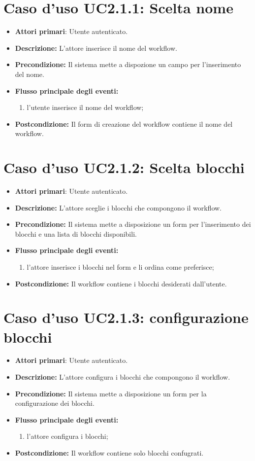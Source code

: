 {{{\section{Caso d'uso UC2.1.1: Scelta nome }
\begin{itemize}
	\item \textbf{Attori primari}: Utente autenticato.
	\item \textbf{Descrizione:} L'attore inserisce il nome del workflow.
	\item \textbf{Precondizione:} Il sistema mette a dispozione un campo per l'inserimento del nome.
	\item \textbf{Flusso principale degli eventi:}
	\begin{enumerate}
		\item l'utente inserisce il nome del workflow;
	\end{enumerate}
	\item \textbf{Postcondizione:} Il form di creazione del workflow contiene il nome del workflow.
\end{itemize}
\section{Caso d'uso UC2.1.2: Scelta blocchi }
\begin{itemize}
	\item \textbf{Attori primari}: Utente autenticato.
	\item \textbf{Descrizione:} L'attore sceglie i blocchi che compongono il workflow.
	\item \textbf{Precondizione:} Il sistema mette a disposizione un form per l'inserimento dei blocchi e una lista di blocchi disponibili.
	\item \textbf{Flusso principale degli eventi:}
	\begin{enumerate}
		\item l'attore inserisce i blocchi nel form e li ordina come preferisce;
	\end{enumerate}
	\item \textbf{Postcondizione:} Il workflow contiene i blocchi desiderati dall'utente.
\end{itemize}
\section{Caso d'uso UC2.1.3: configurazione blocchi }
\begin{itemize}
	\item \textbf{Attori primari}: Utente autenticato.
	\item \textbf{Descrizione:} L'attore configura i blocchi che compongono il workflow.
	\item \textbf{Precondizione:} Il sistema mette a disposizione un form per la configurazione dei blocchi.
	\item \textbf{Flusso principale degli eventi:}
	\begin{enumerate}
		\item l'attore configura i blocchi;
	\end{enumerate}
	\item \textbf{Postcondizione:} Il workflow contiene solo blocchi confugrati.
\end{itemize}
}}}
